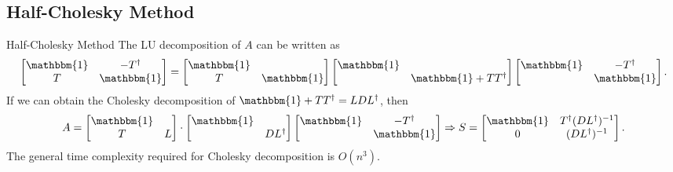 \subsection{Half-Cholesky Method}
\begin{frame}{Half-Cholesky Method}
    The LU decomposition of $A$ can be written as
    \begin{equation*}
        \left[\begin{matrix}
            \mathbbm{1} & -T^\dagger \\ T & \mathbbm{1}
        \end{matrix}\right] = \left[\begin{matrix}
            \mathbbm{1} \\ T & \mathbbm{1}
        \end{matrix}\right] \left[\begin{matrix}
            \mathbbm{1} \\ & \mathbbm{1}+TT^\dagger
        \end{matrix}\right] \left[\begin{matrix}
            \mathbbm{1} & -T^\dagger \\ & \mathbbm{1}
        \end{matrix}\right].
    \end{equation*}
    If we can obtain the Cholesky decomposition of $\mathbbm{1} + TT^\dagger = LDL^\dagger$, then
    \begin{equation}
        A = \left[\begin{matrix}
            \mathbbm{1} \\ T & L
        \end{matrix}\right] \cdot \left[\begin{matrix}
            \mathbbm{1} \\ & DL^\dagger
        \end{matrix}\right] \left[\begin{matrix}
            \mathbbm{1} & -T^\dagger \\ & \mathbbm{1}
        \end{matrix}\right] \Rightarrow S = \left[\begin{matrix}
            \mathbbm{1} & T^\dagger (DL^\dagger)^{-1} \\
            0 & (DL^\dagger)^{-1}
        \end{matrix}\right].
    \end{equation}
    The general time complexity required for Cholesky decomposition is $O(n^3)$.
\end{frame}
